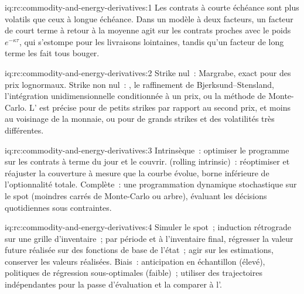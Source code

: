 \begin{solution}{iq:rc:commodity-and-energy-derivatives:1}
Les contrats à courte échéance sont plus volatils que ceux à longue échéance. Dans un modèle à deux facteurs, un
facteur de court terme à retour à la moyenne agit sur les contrats proches avec le poids $e^{-\kappa\tau}$, qui s'estompe
pour les livraisons lointaines, tandis qu'un facteur de long terme les fait tous bouger.
\end{solution}

\begin{solution}{iq:rc:commodity-and-energy-derivatives:2}
Strike nul~: Margrabe, exact pour des prix lognormaux. Strike non nul~: ,
le raffinement de Bjerksund--Stensland, l'intégration unidimensionnelle conditionnée à un prix,
ou la méthode de Monte-Carlo. L' est précise pour de petits strikes par rapport au second prix, et moins
au voisinage de la monnaie, ou pour de grands strikes et des volatilités très différentes.
\end{solution}

\begin{solution}{iq:rc:commodity-and-energy-derivatives:3}
Intrinsèque~: optimiser le programme sur les contrats à terme du jour et le couvrir.  (rolling intrinsic)~:
réoptimiser et réajuster la couverture à mesure que la courbe évolue, borne inférieure de l'optionnalité totale. Complète~: une
programmation dynamique stochastique sur le spot (moindres carrés de Monte-Carlo ou arbre), évaluant les
décisions quotidiennes sous contraintes.
\end{solution}

\begin{solution}{iq:rc:commodity-and-energy-derivatives:4}
Simuler le spot~; induction rétrograde sur une grille d'inventaire~; par période et à l'inventaire final,
régresser la valeur future réalisée sur des fonctions de base de l'état~; agir sur les estimations, conserver
les valeurs réalisées. Biais~: anticipation en échantillon (élevé), politiques de régression sous-optimales (faible)~;
utiliser des trajectoires indépendantes pour la passe d'évaluation et la comparer à l'.
\end{solution}

